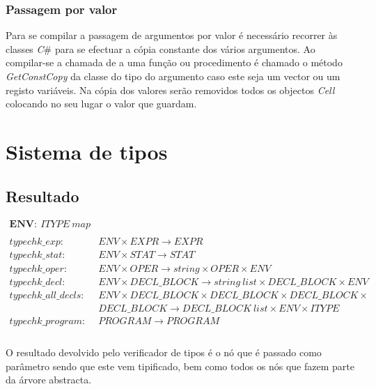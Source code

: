 \subsubsection{Passagem por valor}

Para se compilar a passagem de argumentos por valor é necessário recorrer às 
classes \emph{C}\# para se efectuar a cópia constante dos vários argumentos.
Ao compilar-se a chamada de a uma função ou procedimento é chamado o método 
\emph{GetConstCopy} da classe do tipo do argumento caso este seja um vector ou 
um registo variáveis. Na cópia dos valores serão removidos todos os objectos 
\emph{Cell} colocando no seu lugar o valor que guardam.

\newpage
\section{Sistema de tipos}

\subsection{Resultado}
{
\fontsize{9pt}{10}\selectfont
\ttfamily
$$
\begin{array}{lll}
\textbf{ENV}:~ITYPE~map\\\\
typechk\_exp:			&ENV \times EXPR \rightarrow EXPR\\
typechk\_stat:			&ENV \times STAT \rightarrow STAT\\
typechk\_oper:			&ENV \times	OPER \rightarrow string \times OPER \times 
																		ENV\\
typechk\_decl:			&ENV \times DECL\_BLOCK \rightarrow string~list \times 
														DECL\_BLOCK \times ENV\\
typechk\_all\_decls:	&ENV \times DECL\_BLOCK \times DECL\_BLOCK \times 
														DECL\_BLOCK \times \\
						&DECL\_BLOCK \rightarrow DECL\_BLOCK~list \times ENV 
																\times ITYPE\\
typechk\_program:		&PROGRAM \rightarrow PROGRAM\\
\end{array}
$$
}\\

O resultado devolvido pelo verificador de tipos é o nó que é passado como 
parâmetro sendo que este vem tipificado, bem como todos os nós que fazem parte 
da árvore abstracta.

